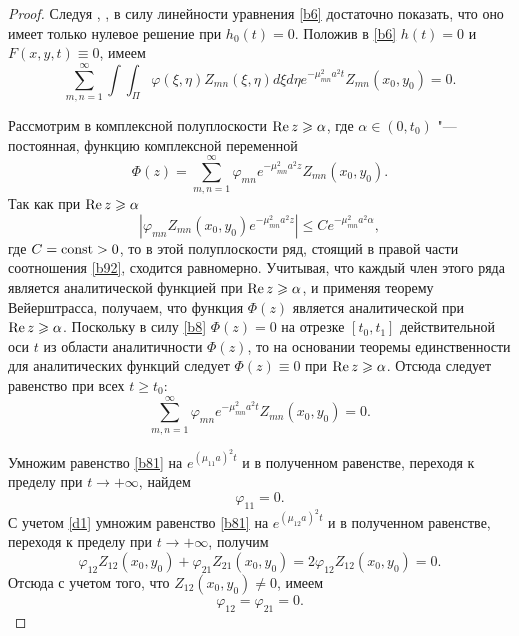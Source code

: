 \begin{proof}
Следуя \cite[c.~119]{zayn:1}, \cite{zayn:7, zayn:9}, в силу линейности уравнения \eqref{b6} достаточно показать, 
что оно имеет только нулевое решение при $h_0(t) =0$. 
Положив в \eqref{b6} $h(t) = 0$ и $F(x,y,t)\equiv 0$, имеем
\begin{equation}
\label{b7}
\sum_{m,n=1}^{\infty}\int\int_{\Pi}\varphi(\xi,\eta)Z_{mn}(\xi,\eta)d\xi d\eta e^{-\mu_{mn}^2a^2t}Z_{mn}(x_0,y_0)=0.
\end{equation}

Рассмотрим в комплексной полуплоскости $\mathop{\rm Re} z\geqslant\alpha$, где ${\alpha\in(0,t_0)}$ "--- постоянная, функцию комплексной переменной
\begin{equation}\label{b8}
\Phi(z)=\sum_{m,n=1}^{\infty}\varphi_{mn}e^{-\mu_{mn}^2a^2z}Z_{mn}(x_0,y_0).
\end{equation} 
Так как при $\mathop{\rm Re} z\geqslant\alpha$
\begin{equation}\label{b92}
|\varphi_{mn}Z_{mn}(x_0,y_0)e^{-\mu_{mn}^2a^2z}|\leqslant Ce^{-\mu_{mn}^2a^2\alpha},
\end{equation}
где $C=\rm const>0$, то в этой полуплоскости ряд, стоящий в правой части соотношения \eqref{b92}, сходится равномерно. 
Учитывая, что каждый член этого ряда является аналитической функцией при $\mathop{\rm Re} z\geqslant\alpha$, и применяя теорему Вейерштрасса, получаем, что функция $\Phi(z)$ является аналитической при $\mathop{\rm Re} z\geqslant\alpha$. 
Поскольку в силу \eqref{b8} $\Phi(z)=0$ на отрезке $[t_0, t_1]$ действительной оси $t$ из области аналитичности $\Phi(z)$, 
то на основании теоремы единственности для аналитических функций следует $\Phi(z)\equiv 0$ при $\mathop{\rm Re}  z\geqslant \alpha$.
Отсюда следует равенство при всех $t\geqslant t_0$:
\begin{equation}\label{b81}
\sum_{m,n=1}^{\infty}\varphi_{mn}e^{-\mu_{mn}^2a^2t}Z_{mn}(x_0,y_0)=0.
\end{equation}

Умножим равенство \eqref{b81} на $e^{(\mu_{11} a)^2 t}$ и в полученном равенстве, переходя к пределу при $t \rightarrow +\infty$, найдем
\begin{equation}
\label{d1}\varphi_{11}=0.
\end{equation}
С учетом \eqref{d1} умножим равенство \eqref{b81} на $e^{(\mu_{12} a)^2 t}$ и в полученном равенстве, переходя к пределу при $t \rightarrow +\infty$, получим
$$
\varphi_{12}Z_{12}(x_0,y_0)+\varphi_{21}Z_{21}(x_0,y_0)=2\varphi_{12}Z_{12}(x_0,y_0)=0.
$$
Отсюда с учетом того, что $Z_{12}(x_0,y_0)\neq0$, имеем
\begin{equation}
\label{d2}
\varphi_{12}=\varphi_{21}=0.
\end{equation}


\end{proof}
